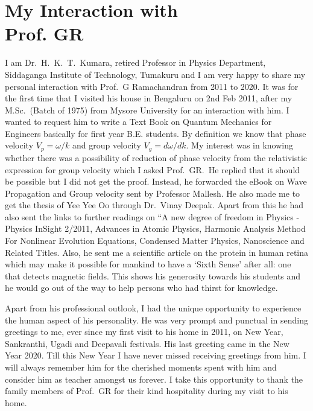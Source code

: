 \chapter[My Interaction with Prof. GR]{My Interaction with\\ Prof. GR}


I am Dr.\ H.\ K.\ T.\ Kumara, retired Professor in Physics Department, Siddaganga Institute of Technology, Tumakuru and I am very happy to share my personal interaction with Prof.\ G Ramachandran from 2011 to 2020. It was for the first time that I visited his house in Bengaluru on 2nd Feb 2011, after my M.Sc.\ (Batch of 1975) from Mysore University for an interaction with him. I wanted to request him to write a Text Book on Quantum Mechanics for Engineers basically for first year B.E. students. By definition we know that phase velocity $V_p=\omega/k$ and group velocity $V_g=d\omega/dk$.  My interest was in knowing whether there was a possibility of reduction of phase velocity from the relativistic expression for group velocity which I asked Prof.\ GR.\  He replied that it should be possible but I did not get the proof. Instead, he forwarded the eBook on Wave Propagation and Group velocity sent by Professor Mallesh.  He also made me to get the thesis of Yee Yee Oo through Dr.\ Vinay Deepak. Apart from this he had also sent the links to further readings on “A new degree of freedom in Physics - Physics InSight 2/2011, Advances in Atomic Physics, Harmonic Analysis Method For Nonlinear Evolution Equations, Condensed Matter Physics, Nanoscience and Related Titles.  Also, he sent me a scientific article on the protein in human retina which may make it possible for mankind to have a ‘Sixth Sense’ after all: one that detects magnetic fields. This shows his generosity towards his students and he would go out of the way to help persons who had thirst for knowledge. 

Apart from his professional outlook, I had the unique opportunity to experience the human aspect of his personality.  He was very prompt and punctual in sending greetings to me, ever since my first visit to his home in 2011, on New Year, Sankranthi, Ugadi and Deepavali festivals.  His last greeting came in the New Year 2020.  Till this New Year I have never missed receiving greetings from him. I will always remember him for the cherished  moments spent with him and consider him as teacher amongst us forever. I take this opportunity to thank the family members of Prof.\ GR for their kind hospitality during my visit to his home.
\vskip 0.5cm

